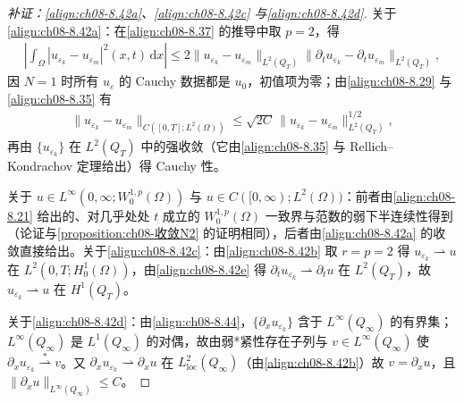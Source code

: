 \documentclass[../../main.tex]{subfiles}%
\begin{document}
\begin{proof}[补证：\eqref{align:ch08-8.42a}、\eqref{align:ch08-8.42c} 与\eqref{align:ch08-8.42d}]
关于\eqref{align:ch08-8.42a}：在\eqref{align:ch08-8.37} 的推导中取 $p=2$，得
\begin{align*}
\left|\int_\Omega|u_{\varepsilon_k}-u_{\varepsilon_m}|^2(x,t)\,\mathrm{d}x\right|
\leqslant 2\|u_{\varepsilon_k}-u_{\varepsilon_m}\|_{L^2(Q_T)}\|\partial_tu_{\varepsilon_k}-\partial_tu_{\varepsilon_m}\|_{L^2(Q_T)},
\end{align*}
因 $N=1$ 时所有 $u_\varepsilon$ 的 Cauchy 数据都是 $u_0$，初值项为零；由\eqref{align:ch08-8.29} 与\eqref{align:ch08-8.35} 有
\begin{align*}
\|u_{\varepsilon_k}-u_{\varepsilon_m}\|_{C([0,T];L^2(\Omega))}
\leqslant\sqrt{2C}\,\|u_{\varepsilon_k}-u_{\varepsilon_m}\|^{1/2}_{L^2(Q_T)},
\end{align*}
再由 $\{u_{\varepsilon_k}\}$ 在 $L^2(Q_T)$ 中的强收敛（它由\eqref{align:ch08-8.35} 与 Rellich--Kondrachov 定理给出）得 Cauchy 性。

关于 $u\in L^\infty(0,\infty;W^{1,p}_0(\Omega))$ 与 $u\in C([0,\infty);L^2(\Omega))$：前者由\eqref{align:ch08-8.21} 给出的、对几乎处处 $t$ 成立的 $W^{1,p}_0(\Omega)$ 一致界与范数的弱下半连续性得到（论证与\cref{proposition:ch08-收敛N2} 的证明相同），后者由\eqref{align:ch08-8.42a} 的收敛直接给出。关于\eqref{align:ch08-8.42c}：由\eqref{align:ch08-8.42b} 取 $r=p=2$ 得 $u_{\varepsilon_k}\rightharpoonup u$ 在 $L^2(0,T;H^1_0(\Omega))$，由\eqref{align:ch08-8.42e} 得 $\partial_tu_{\varepsilon_k}\rightharpoonup\partial_tu$ 在 $L^2(Q_T)$，故 $u_{\varepsilon_k}\rightharpoonup u$ 在 $H^1(Q_T)$。

关于\eqref{align:ch08-8.42d}：由\eqref{align:ch08-8.44}，$\{\partial_xu_{\varepsilon_k}\}$ 含于 $L^\infty(Q_\infty)$ 的有界集；$L^\infty(Q_\infty)$ 是 $L^1(Q_\infty)$ 的对偶，故由弱*紧性存在子列与 $v\in L^\infty(Q_\infty)$ 使 $\partial_xu_{\varepsilon_k}\stackrel{*}{\rightharpoonup}v$。又 $\partial_xu_{\varepsilon_k}\rightharpoonup\partial_xu$ 在 $L^2_{\mathrm{loc}}(Q_\infty)$（由\eqref{align:ch08-8.42b}）故 $v=\partial_xu$，且 $\|\partial_xu\|_{L^\infty(Q_\infty)}\leqslant C$。
\end{proof}
\end{document}
